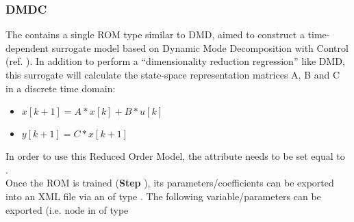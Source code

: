 \subsubsection{DMDC}
  The  contains a single ROM type similar to DMD, aimed to         construct a time-
  dependent surrogate model based on Dynamic         Mode Decomposition with Control (ref.
  \cite{proctor2016dynamic}).         In addition to perform a ``dimensionality reduction
  regression'' like DMD, this surrogate will         calculate the state-space representation
  matrices A, B and  C in a discrete time domain:         \begin{itemize}           \item
  $x[k+1]=A*x[k]+B*u[k]$           \item $y[k+1]=C*x[k+1]$         \end{itemize}          In order
  to use this Reduced Order Model, the  attribute          needs to be
  set equal to .         \\         Once the ROM  is trained (\textbf{Step}
  ), its         parameters/coefficients can be exported into an XML file
  via an  of type . The following variable/parameters can be
  exported (i.e.          node         in  of type
